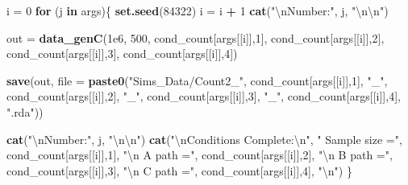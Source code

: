 \documentclass[]{DissertateCUNY}
\newenvironment{Shaded}{\begin{snugshade}}{\end{snugshade}}
\newcommand{\KeywordTok}[1]{\textcolor[rgb]{0.13,0.29,0.53}{\textbf{#1}}}
\newcommand{\DataTypeTok}[1]{\textcolor[rgb]{0.13,0.29,0.53}{#1}}
\newcommand{\DecValTok}[1]{\textcolor[rgb]{0.00,0.00,0.81}{#1}}
\newcommand{\FloatTok}[1]{\textcolor[rgb]{0.00,0.00,0.81}{#1}}
\newcommand{\CharTok}[1]{\textcolor[rgb]{0.31,0.60,0.02}{#1}}
\newcommand{\StringTok}[1]{\textcolor[rgb]{0.31,0.60,0.02}{#1}}
\newcommand{\ControlFlowTok}[1]{\textcolor[rgb]{0.13,0.29,0.53}{\textbf{#1}}}
\newcommand{\OperatorTok}[1]{\textcolor[rgb]{0.81,0.36,0.00}{\textbf{#1}}}
\newcommand{\NormalTok}[1]{#1}
\begin{document}
\begin{Shaded}
\begin{Highlighting}[]
\NormalTok{i =}\StringTok{ }\DecValTok{0}
\ControlFlowTok{for}\NormalTok{ (j }\ControlFlowTok{in}\NormalTok{ args)\{}
  \KeywordTok{set.seed}\NormalTok{(}\DecValTok{84322}\NormalTok{)}
\NormalTok{  i =}\StringTok{ }\NormalTok{i }\OperatorTok{+}\StringTok{ }\DecValTok{1}
  \KeywordTok{cat}\NormalTok{(}\StringTok{"}\CharTok{\textbackslash{}n}\StringTok{Number:"}\NormalTok{, j, }\StringTok{"}\CharTok{\textbackslash{}n\textbackslash{}n}\StringTok{"}\NormalTok{)}
  
\NormalTok{  out =}\StringTok{ }\KeywordTok{data_genC}\NormalTok{(}\FloatTok{1e6}\NormalTok{, }\DecValTok{500}\NormalTok{, }
\NormalTok{                  cond_count[args[[i]],}\DecValTok{1}\NormalTok{], }
\NormalTok{                  cond_count[args[[i]],}\DecValTok{2}\NormalTok{], }
\NormalTok{                  cond_count[args[[i]],}\DecValTok{3}\NormalTok{], }
\NormalTok{                  cond_count[args[[i]],}\DecValTok{4}\NormalTok{])}
  
  \KeywordTok{save}\NormalTok{(out, }\DataTypeTok{file =} \KeywordTok{paste0}\NormalTok{(}\StringTok{"Sims_Data/Count2_"}\NormalTok{, }
\NormalTok{                          cond_count[args[[i]],}\DecValTok{1}\NormalTok{], }\StringTok{"_"}\NormalTok{,}
\NormalTok{                          cond_count[args[[i]],}\DecValTok{2}\NormalTok{], }\StringTok{"_"}\NormalTok{,}
\NormalTok{                          cond_count[args[[i]],}\DecValTok{3}\NormalTok{], }\StringTok{"_"}\NormalTok{,}
\NormalTok{                          cond_count[args[[i]],}\DecValTok{4}\NormalTok{], }\StringTok{".rda"}\NormalTok{))}
  
  \KeywordTok{cat}\NormalTok{(}\StringTok{"}\CharTok{\textbackslash{}n}\StringTok{Number:"}\NormalTok{, j, }\StringTok{"}\CharTok{\textbackslash{}n\textbackslash{}n}\StringTok{"}\NormalTok{)}
  \KeywordTok{cat}\NormalTok{(}\StringTok{"}\CharTok{\textbackslash{}n}\StringTok{Conditions Complete:}\CharTok{\textbackslash{}n}\StringTok{"}\NormalTok{,}
      \StringTok{" Sample size ="}\NormalTok{, cond_count[args[[i]],}\DecValTok{1}\NormalTok{], }
      \StringTok{"}\CharTok{\textbackslash{}n}\StringTok{  A path      ="}\NormalTok{, cond_count[args[[i]],}\DecValTok{2}\NormalTok{], }
      \StringTok{"}\CharTok{\textbackslash{}n}\StringTok{  B path      ="}\NormalTok{, cond_count[args[[i]],}\DecValTok{3}\NormalTok{], }
      \StringTok{"}\CharTok{\textbackslash{}n}\StringTok{  C path      ="}\NormalTok{, cond_count[args[[i]],}\DecValTok{4}\NormalTok{], }\StringTok{"}\CharTok{\textbackslash{}n}\StringTok{"}\NormalTok{)}
\NormalTok{\}}
\end{Highlighting}
\end{Shaded}
\end{document}
